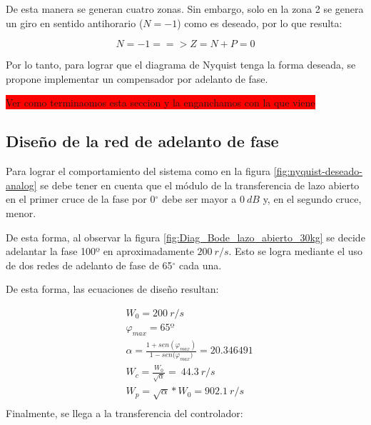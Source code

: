 De esta manera se generan cuatro zonas. Sin embargo, solo en la zona 2 se genera un giro en sentido antihorario ($N=-1$) como es deseado, por lo que resulta:

\begin{equation*}
	N = -1 ==> Z = N + P = 0
\end{equation*}


Por lo tanto, para lograr que el diagrama de Nyquist tenga la forma deseada, se propone implementar un compensador por adelanto de fase.

\colorbox{red}{Ver como terminaomos esta seccion y la enganchamos con la que viene}


\subsection{Diseño de la red de adelanto de fase}

Para lograr el comportamiento del sistema como en la figura 	\ref{fig:nyquist-deseado-analog} se debe tener en cuenta que el m\'{o}dulo de la transferencia de lazo abierto en el primer cruce de la fase por 0$\mathrm{{}^\circ}$ debe ser mayor a $0\:dB$ y, en el segundo cruce, menor. 

De esta forma, al observar la figura \ref{fig:Diag_Bode_lazo_abierto_30kg} se decide adelantar la fase 100º en aproximadamente $200\:r/s$. Esto se logra mediante el uso de dos redes de adelanto de fase de 65$\mathrm{{}^\circ}$ cada una. 


\noindent De esta forma, las ecuaciones de dise\~{n}o resultan:

\begin{equation*}
	\begin{aligned}
		&W_0 =200\:r/s\\
		&{\varphi }_{max} =65\textrm{º}\\
		&\alpha =\frac{1+sen({\varphi }_{max})}{1-sen{(\varphi }_{max})}=20.346491\\
		&W_c =\frac{W_0}{\sqrt{\alpha }}=\ 44.3\:r/s\\
		&W_p =\sqrt{\alpha }*W_0=902.1\: r/s\\
	\end{aligned}
\end{equation*} 
\noindent Finalmente, se llega a la transferencia del controlador:

